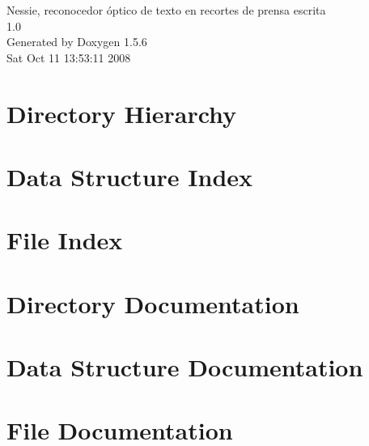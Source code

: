 \documentclass[a4paper]{book}
\begin{document}
\begin{titlepage}
\vspace*{7cm}
\begin{center}
{\Large Nessie, reconocedor óptico de texto en recortes de prensa escrita \\[1ex]\large 1.0 }\\
\vspace*{1cm}
{\large Generated by Doxygen 1.5.6}\\
\vspace*{0.5cm}
{\small Sat Oct 11 13:53:11 2008}\\
\end{center}
\end{titlepage}
\clearemptydoublepage
{}
\tableofcontents
\clearemptydoublepage
{}
\chapter{Directory Hierarchy}

\chapter{Data Structure Index}

\chapter{File Index}

\chapter{Directory Documentation}


\chapter{Data Structure Documentation}








\chapter{File Documentation}

















\printindex
\end{document}
